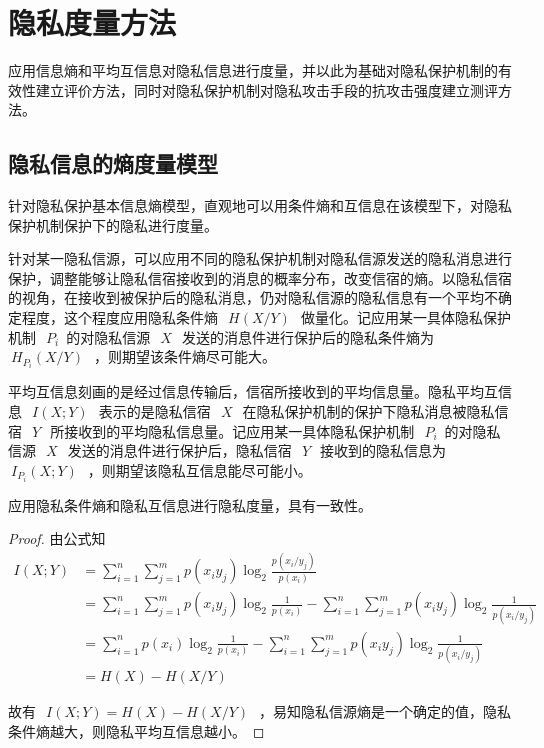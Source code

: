 \section{隐私度量方法}\label{Privacy measures}
应用信息熵和平均互信息对隐私信息进行度量，并以此为基础对隐私保护机制的有效性建立评价方法，同时对隐私保护机制对隐私攻击手段的抗攻击强度建立测评方法。

\subsection{隐私信息的熵度量模型}

针对隐私保护基本信息熵模型，直观地可以用条件熵和互信息在该模型下，对隐私保护机制保护下的隐私进行度量。

针对某一隐私信源，可以应用不同的隐私保护机制对隐私信源发送的隐私消息进行保护，调整能够让隐私信宿接收到的消息的概率分布，改变信宿的熵。以隐私信宿的视角，在接收到被保护后的隐私消息，仍对隐私信源的隐私信息有一个平均不确定程度，这个程度应用隐私条件熵~$~H(X/Y)~$~做量化。记应用某一具体隐私保护机制~$~P_{i}$~的对隐私信源~$~X~$~发送的消息件进行保护后的隐私条件熵为~$~H_{P_{i}}(X/Y)~$~，则期望该条件熵尽可能大。

平均互信息刻画的是经过信息传输后，信宿所接收到的平均信息量。隐私平均互信息~$~I(X;Y)~$~表示的是隐私信宿~$~X~$~在隐私保护机制的保护下隐私消息被隐私信宿~$~Y~$~所接收到的平均隐私信息量。记应用某一具体隐私保护机制~$~P_{i}$~的对隐私信源~$~X~$~发送的消息件进行保护后，隐私信宿~$~Y~$~接收到的隐私信息为~$~I_{P_{i}}(X;Y)~$~，则期望该隐私互信息能尽可能小。

\begin{property}
应用隐私条件熵和隐私互信息进行隐私度量，具有一致性。
\end{property}
\begin{proof}
	由公式知
	\begin{equation}
	\begin{split}
	I(X;Y)&=\sum_{i=1}^{n}\sum_{j=1}^{m}p(x_{i}y_{j})\log_{2}\frac{p(x_{i}/y_{j})}{p(x_{i})}\\
	&=\sum_{i=1}^{n}\sum_{j=1}^{m}p(x_{i}y_{j})\log_{2}\frac{1}{p(x_{i})}-\sum_{i=1}^{n}\sum_{j=1}^{m}p(x_{i}y_{j})\log_{2}\frac{1}{p(x_{i}/y_{j})}\\
	&=\sum_{i=1}^{n}p(x_{i})\log_{2}\frac{1}{p(x_{i})}-\sum_{i=1}^{n}\sum_{j=1}^{m}p(x_{i}y_{j})\log_{2}\frac{1}{p(x_{i}/y_{j})}\\
	&=H(X)-H(X/Y)
	\end{split}
	\end{equation}
	
	故有~$~I(X;Y)=H(X)-H(X/Y)~$~，易知隐私信源熵是一个确定的值，隐私条件熵越大，则隐私平均互信息越小。
\end{proof}


